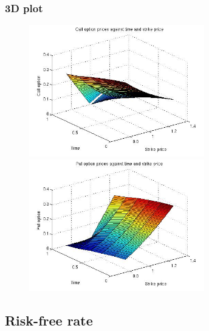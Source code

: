 \documentclass[12pt]{article}
\begin{document}
    \subsubsection*{3D plot}
    \begin{figure}[ht]
    \centering
      \begin{minipage}{.45\textwidth}
        \centering
        \includegraphics[width=3in]{call-time-strike.jpg}
      \end{minipage}
      \begin{minipage}{.45\textwidth}
        \centering
        \includegraphics[width=3in]{put-time-strike.jpg}
      \end{minipage}
    \end{figure}

  \newpage
  \subsection*{Risk-free rate}
\end{document}
